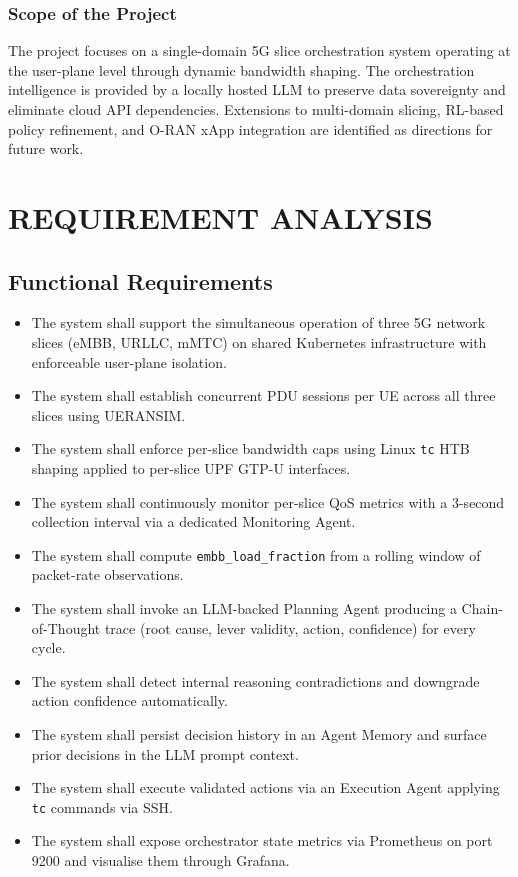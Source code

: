 \subsection{Scope of the Project}

The project focuses on a single-domain 5G slice orchestration system operating at the user-plane level through dynamic bandwidth shaping. The orchestration intelligence is provided by a locally hosted LLM to preserve data sovereignty and eliminate cloud API dependencies. Extensions to multi-domain slicing, RL-based policy refinement, and O-RAN xApp integration are identified as directions for future work.

\chapter{REQUIREMENT ANALYSIS}

\section{Functional Requirements}

\begin{itemize}[leftmargin=*]
  \item The system shall support the simultaneous operation of three 5G network slices (eMBB, URLLC, mMTC) on shared Kubernetes infrastructure with enforceable user-plane isolation.
  \item The system shall establish concurrent PDU sessions per UE across all three slices using UERANSIM.
  \item The system shall enforce per-slice bandwidth caps using Linux \texttt{tc} HTB shaping applied to per-slice UPF GTP-U interfaces.
  \item The system shall continuously monitor per-slice QoS metrics with a 3-second collection interval via a dedicated Monitoring Agent.
  \item The system shall compute \texttt{embb\_load\_fraction} from a rolling window of packet-rate observations.
  \item The system shall invoke an LLM-backed Planning Agent producing a Chain-of-Thought trace (root cause, lever validity, action, confidence) for every cycle.
  \item The system shall detect internal reasoning contradictions and downgrade action confidence automatically.
  \item The system shall persist decision history in an Agent Memory and surface prior decisions in the LLM prompt context.
  \item The system shall execute validated actions via an Execution Agent applying \texttt{tc} commands via SSH.
  \item The system shall expose orchestrator state metrics via Prometheus on port 9200 and visualise them through Grafana.
\end{itemize}

